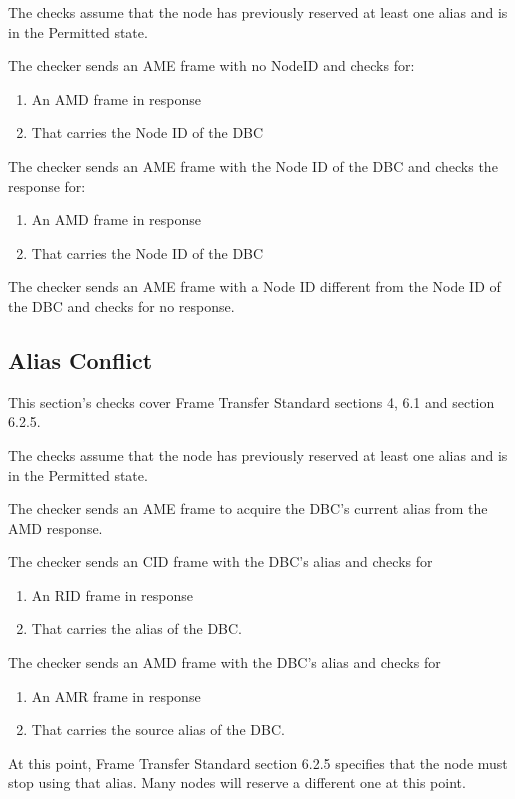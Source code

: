 The checks assume that the node has previously reserved at least one alias
and is in the Permitted state.

The checker sends an AME frame with no NodeID and checks for:
\begin{enumerate}
\item An AMD frame in response
\item That carries the Node ID of the DBC
\end{enumerate}

The checker sends an AME frame with the Node ID of the DBC and checks the response for:
\begin{enumerate}
\item An AMD frame in response
\item That carries the Node ID of the DBC
\end{enumerate}

The checker sends an AME frame with a Node ID different from the Node ID of the DBC 
and checks for no response.


\subsection{Alias Conflict}

This section's checks cover Frame Transfer Standard sections 4, 6.1 and section 6.2.5.

The checks assume that the node has previously reserved at least one alias
and is in the Permitted state.

The checker sends an AME frame to acquire the DBC's current alias from the AMD
response.

The checker sends an CID frame with the DBC's alias and checks for
\begin{enumerate}
\item An RID frame in response
\item That carries the alias of the DBC.
\end{enumerate}

The checker sends an AMD frame with the DBC's alias and checks for
\begin{enumerate}
\item An AMR frame in response
\item That carries the source alias of the DBC.
\end{enumerate}

At this point, Frame Transfer Standard section 6.2.5 specifies that the node must stop
using that alias.  Many nodes will reserve a different one at this point.

